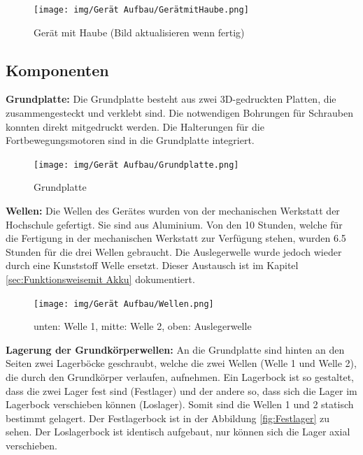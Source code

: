 \begin{figure}[H]
  \texttt{[image: img/Gerät Aufbau/GerätmitHaube.png]}
  \centering
  \caption{Gerät mit Haube (Bild aktualisieren wenn fertig)}
  \label{fig:GerätmitHaube}
\end{figure}

\newpage

\subsection{Komponenten}
\label{subsec:Komponenten}

\textbf{Grundplatte:} Die Grundplatte besteht aus zwei 3D-gedruckten Platten, die zusammengesteckt und verklebt sind. Die notwendigen Bohrungen für Schrauben konnten direkt mitgedruckt werden. Die Halterungen für die Fortbewegungsmotoren sind in die Grundplatte integriert.

\begin{figure}[H]
  \texttt{[image: img/Gerät Aufbau/Grundplatte.png]}
  \centering
  \caption{Grundplatte}
  \label{fig:Grundplatte}
\end{figure}

\textbf{Wellen:} Die Wellen des Gerätes wurden von der mechanischen Werkstatt der Hochschule gefertigt. Sie sind aus Aluminium. Von den 10 Stunden, welche für die Fertigung in der mechanischen Werkstatt zur Verfügung stehen, wurden 6.5 Stunden für die drei Wellen gebraucht. Die Auslegerwelle wurde jedoch wieder durch eine Kunststoff Welle ersetzt. Dieser Austausch ist im Kapitel \ref{sec:Funktionsweisemit Akku} dokumentiert.

\begin{figure}[H]
  \texttt{[image: img/Gerät Aufbau/Wellen.png]}
  \centering
  \caption{unten: Welle 1, mitte: Welle 2, oben: Auslegerwelle}
  \label{fig:Wellen}
\end{figure}

\newpage

\textbf{Lagerung der Grundkörperwellen:} An die Grundplatte sind hinten an den Seiten zwei Lagerböcke geschraubt, welche die zwei Wellen (Welle 1 und Welle 2), die durch den Grundkörper verlaufen, aufnehmen. Ein Lagerbock ist so gestaltet, dass die zwei Lager fest sind (Festlager) und der andere so, dass sich die Lager im Lagerbock verschieben können (Loslager). Somit sind die Wellen 1 und 2 statisch bestimmt gelagert. Der Festlagerbock ist in der Abbildung \ref{fig:Festlager} zu sehen. Der Loslagerbock ist identisch aufgebaut, nur können sich die Lager axial verschieben.

